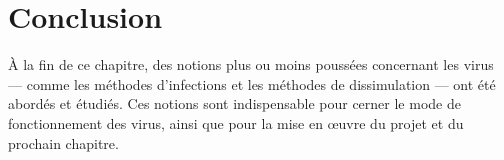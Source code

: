 
\section{Conclusion}
À la fin de ce chapitre, des notions plus ou moins poussées concernant les virus --- comme les méthodes d'infections 
et les méthodes de dissimulation --- ont été abordés et étudiés. Ces notions sont indispensable pour cerner le 
mode de fonctionnement des virus, ainsi que pour la mise en œuvre du projet et du prochain chapitre.